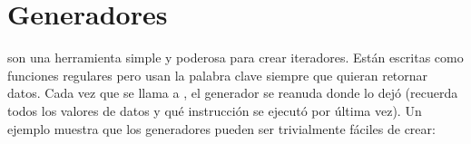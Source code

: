\documentclass[a4,10pt,spanish]{sphinxmanual}
\begin{document}
\begin{sphinxVerbatim}[commandchars=\\\{\}]
  
   
    
\end{sphinxVerbatim}


\section{Generadores}
\label{\detokenize{tutorial/classes:generators}}\label{\detokenize{tutorial/classes:tut-generators}}
\sphinxAtStartPar
{\hyperref[\detokenize{glossary:term-generator}]{}} son una herramienta simple y poderosa para crear iteradores. Están escritas como funciones regulares pero usan la palabra clave  siempre que quieran retornar datos. Cada vez que se llama a , el generador se reanuda donde lo dejó (recuerda todos los valores de datos y qué instrucción se ejecutó por última vez). Un ejemplo muestra que los generadores pueden ser trivialmente fáciles de crear:

\begin{sphinxVerbatim}[commandchars=\\\{\}]
 
         
         \PYG{p}{[}\PYG{p}{]}
\end{sphinxVerbatim}

\begin{sphinxVerbatim}[commandchars=\\\{\}]
   
    
\end{sphinxVerbatim}
\end{document}

